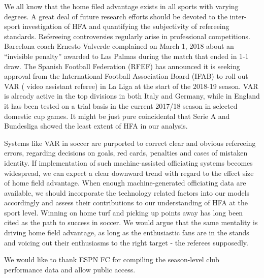 \documentclass[USenglish]{article}
\begin{document}
We all know that the home filed advantage exists in all sports with varying degrees. A great deal of future research efforts should be devoted to the inter-sport investigation of HFA and quantifying the subjectivity of refereeing standards. 
Refereeing controversies regularly arise in professional competitions. Barcelona coach Ernesto Valverde complained on March 1, 2018 about an “invisible penalty” awarded to Las Palmas during the match that ended  in 1-1 draw.
The Spanish Football Federation (RFEF) has announced it is seeking approval from the International Football Association Board (IFAB) to roll out VAR ( video assistant referee)  in La Liga at the start of the 2018-19 season. VAR is already active in the top divisions in both Italy and Germany, while in England it has been tested on a trial basis in the current 2017/18 season in selected domestic cup games. It might be just pure coincidental that Serie A and Bundesliga showed the least extent of HFA in our analysis. 

Systems like VAR in soccer are purported to correct clear and obvious refereeing errors, regarding decisions on goals, red cards, penalties and cases of mistaken identity. If implementation of such machine-assisted officiating  systems becomes widespread, we can expect a clear downward trend with regard to the effect size of home field advantage. When enough machine-generated officiating data are available, we should incorporate the technology related factors into our models accordingly and assess their contributions to our understanding of HFA at the sport level. Winning on home turf and picking up points away has long been cited as the path to success in soccer. We would argue that the same mentality is driving home field advantage, as long as the enthusiastic fans are in the stands and voicing out their enthusiasms to the right target - the referees supposedly.   
 

\newpage
\begin{acknowledgement}

We would like to thank ESPN FC for compiling the season-level club performance data and allow public access.

\end{acknowledgement}

\newpage

%

\end{document}
